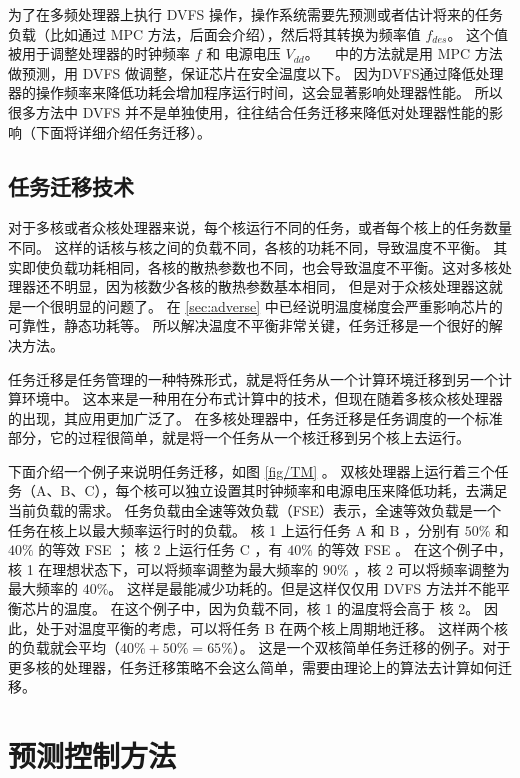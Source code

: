 为了在多频处理器上执行 DVFS 操作，操作系统需要先预测或者估计将来的任务负载（比如通过 MPC 方法，后面会介绍），然后将其转换为频率值 $f_{des}$。
这个值被用于调整处理器的时钟频率 $f$  和 电源电压 $V_{dd}$。 
~\cite{Zanini:ECCTD'09} 中的方法就是用 MPC 方法做预测，用 DVFS 做调整，保证芯片在安全温度以下。
因为DVFS通过降低处理器的操作频率来降低功耗会增加程序运行时间，这会显著影响处理器性能。
所以很多方法中 DVFS 并不是单独使用，往往结合任务迁移来降低对处理器性能的影响（下面将详细介绍任务迁移）。

\subsection{任务迁移技术}\label{sec:taskm}

对于多核或者众核处理器来说，每个核运行不同的任务，或者每个核上的任务数量不同。
这样的话核与核之间的负载不同，各核的功耗不同，导致温度不平衡。
其实即使负载功耗相同，各核的散热参数也不同，也会导致温度不平衡。这对多核处理器还不明显，因为核数少各核的散热参数基本相同，
但是对于众核处理器这就是一个很明显的问题了。 在 \ref{sec:adverse} 中已经说明温度梯度会严重影响芯片的可靠性，静态功耗等。
所以解决温度不平衡非常关键，任务迁移是一个很好的解决方法。

任务迁移是任务管理的一种特殊形式，就是将任务从一个计算环境迁移到另一个计算环境中。
这本来是一种用在分布式计算中的技术，但现在随着多核众核处理器的出现，其应用更加广泛了。
在多核处理器中，任务迁移是任务调度的一个标准部分，它的过程很简单，就是将一个任务从一个核迁移到另个核上去运行。

下面介绍一个例子来说明任务迁移，如图 \ref{fig/TM} 。
双核处理器上运行着三个任务（A、B、C），每个核可以独立设置其时钟频率和电源电压来降低功耗，去满足当前负载的需求。
任务负载由全速等效负载（FSE）表示，全速等效负载是一个任务在核上以最大频率运行时的负载。
核 1 上运行任务 A 和 B ，分别有 $ 50\% $ 和 $ 40\%$ 的等效 FSE ；
核 2 上运行任务 C ，有 $ 40\%$ 的等效 FSE 。
在这个例子中，核 1 在理想状态下，可以将频率调整为最大频率的 $90\%$ ，核 2 可以将频率调整为最大频率的 $40\%$。
这样是最能减少功耗的。但是这样仅仅用 DVFS 方法并不能平衡芯片的温度。
在这个例子中，因为负载不同，核 1 的温度将会高于 核 2。
因此，处于对温度平衡的考虑，可以将任务 B 在两个核上周期地迁移。
这样两个核的负载就会平均（$ 40\% + 50\% = 65\% $）。
这是一个双核简单任务迁移的例子。对于更多核的处理器，任务迁移策略不会这么简单，需要由理论上的算法去计算如何迁移。


\section{预测控制方法}\label{sec:pcm}

